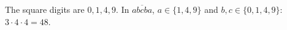 The square digits are $0,1,4,9$. In $\overline{abcba}$, $a\in\{1,4,9\}$ and $b,c\in\{0,1,4,9\}$: $3\cdot4\cdot4=\boxed{48}$.

